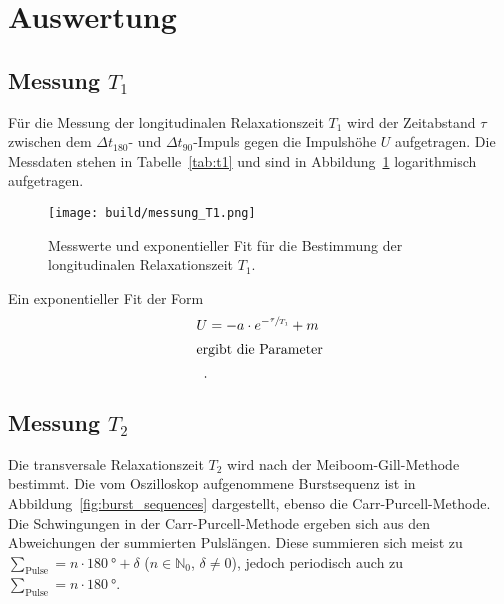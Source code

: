\section{Auswertung}%
\label{sec:auswertung}

\subsection{Messung \texorpdfstring{$T_1$}{T1}}%
\label{sub:messung_t_1_}

Für die Messung der longitudinalen Relaxationszeit $T_1$ wird der Zeitabstand
$\tau$ zwischen dem $\Delta t_{180}$- und $\Delta t_{90}$-Impuls
gegen die Impulshöhe $U$ aufgetragen.
Die Messdaten stehen in Tabelle~\ref{tab:t1} und sind in Abbildung~\ref{fig:messung_T1}
logarithmisch aufgetragen.

\begin{table}[ht]
  \centering
  \caption{%
    Messwerte für die Bestimmung der longitudinalen Relaxationszeit $T_1$.%
  }%
  \label{tab:t1}
  
\end{table}

\begin{figure}[ht]
  \centering
  \texttt{[image: build/messung\_T1.png]}
  \caption{%
    Messwerte und exponentieller Fit für die Bestimmung der longitudinalen Relaxationszeit $T_1$.%
  }%
  \label{fig:messung_T1}
\end{figure}

Ein exponentieller Fit der Form
\begin{align}
  \nonumber U &= -a \cdot e^{-\sfrac{\tau}{T_1}} + m \\
  \intertext{ergibt die Parameter}
  \label{eq:t1}
  .
\end{align}

\subsection{Messung \texorpdfstring{$T_2$}{T2}}%
\label{sub:messung_t_2_}

Die transversale Relaxationszeit $T_2$ wird nach der Meiboom-Gill-Methode bestimmt.
Die vom Oszilloskop aufgenommene Burstsequenz ist in Abbildung~\ref{fig:burst_sequences}
dargestellt, ebenso die Carr-Purcell-Methode.
Die Schwingungen in der Carr-Purcell-Methode ergeben sich aus den Abweichungen der summierten Pulslängen.
Diese summieren sich meist zu $\sum_{\text{Pulse}} = n \cdot \SI{180}{\degree} + \delta$ ($n \in \mathbb{N}_0$, $\delta \neq 0$),
jedoch periodisch auch zu $\sum_{\text{Pulse}} = n \cdot \SI{180}{\degree}$.

